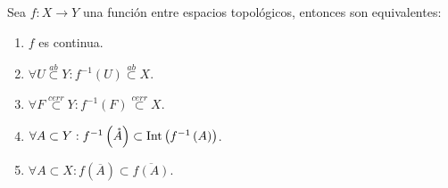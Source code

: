\begin{prop}
Sea $f:X\rightarrow Y$ una función entre espacios topológicos, entonces son equivalentes:
\begin{enumerate}
    \item $f$ es continua.
    \item $\forall U \stackrel{ab}{\subset} Y : f^{-1}\left( U \right) \stackrel{ab}{\subset} X$.
    \item $\forall F \stackrel{cerr}{\subset} Y : f^{-1}\left( F \right) \stackrel{cerr}{\subset} X$.
    \item $\forall A \subset Y : f^{-1}\left( \mathring{A} \right) \subset \operatorname{Int}\left( f^{-1}\left( A \right) \right)$.
    \item $\forall A \subset X : f\left( \overline{A} \right) \subset \overline{f\left( A \right)}$.
\end{enumerate}
\end{prop}
